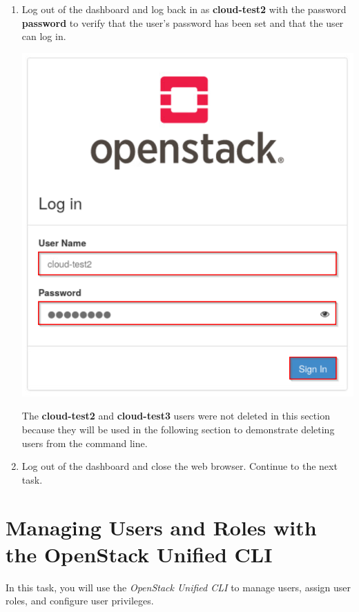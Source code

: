 \documentclass[letterpaper, 12pt]{article}
\begin{document}
\begin{enumerate}
    \item Log out of the dashboard and log back in as \textbf{cloud-test2} with the password \textbf{password} to verify that the user's password has been set and that the user can log in.

    \begin{center}
        \includegraphics[scale=0.5]{images/part3/step18.png}
    \end{center}

    \begin{notebox}
        The \textbf{cloud-test2} and \textbf{cloud-test3} users were not deleted in this section because they will be used in the following section to demonstrate deleting users from the command line.
    \end{notebox}

    \item Log out of the dashboard and close the web browser.
    Continue to the next task.
\end{enumerate}

\section{Managing Users and Roles with the OpenStack Unified CLI}
\label{sec:managing_users_using_the_openstack_unified_cli}
In this task, you will use the \textit{OpenStack Unified CLI} to manage users, assign user roles, and configure user privileges.
\end{document}

